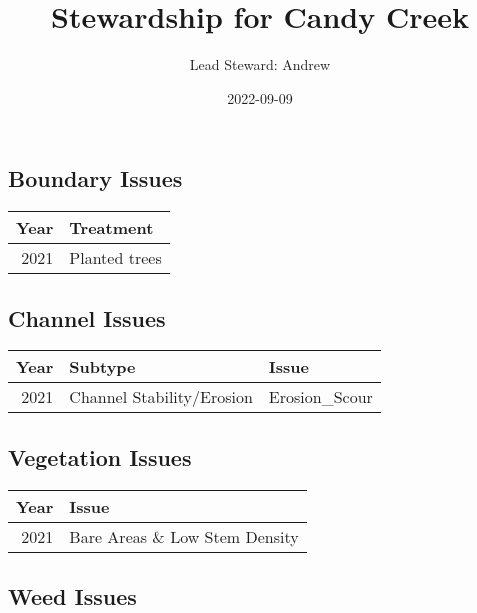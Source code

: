 \documentclass[
  landscape]{article}
\title{Stewardship for Candy Creek}
\author{Lead Steward: Andrew}
\date{2022-09-09}
\begin{document}
\maketitle

\hypertarget{boundary-issues}{%
\subsection{Boundary Issues}\label{boundary-issues}}

\begin{longtable}[]{@{}rl@{}}
\toprule()
Year & Treatment \\
\midrule()
\endhead
2021 & Planted trees \\
\bottomrule()
\end{longtable}

\hypertarget{channel-issues}{%
\subsection{Channel Issues}\label{channel-issues}}

\begin{longtable}[]{@{}rll@{}}
\toprule()
Year & Subtype & Issue \\
\midrule()
\endhead
2021 & Channel Stability/Erosion & Erosion\_Scour \\
\bottomrule()
\end{longtable}

\hypertarget{vegetation-issues}{%
\subsection{Vegetation Issues}\label{vegetation-issues}}

\begin{longtable}[]{@{}rl@{}}
\toprule()
Year & Issue \\
\midrule()
\endhead
2021 & Bare Areas \& Low Stem Density \\
\bottomrule()
\end{longtable}

\hypertarget{weed-issues}{%
\subsection{Weed Issues}\label{weed-issues}}
\end{document}
